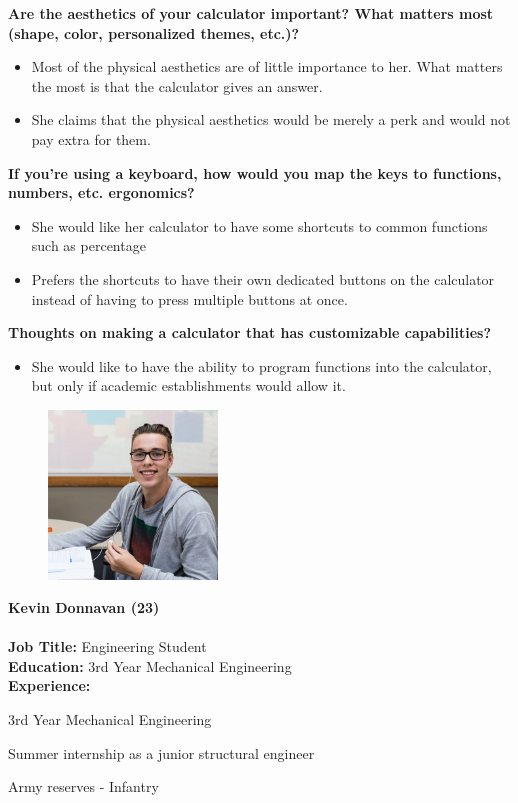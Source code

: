 \documentclass{article}
\begin{document}
\textbf{Are the aesthetics of your calculator important? What matters most (shape, color,  personalized themes, etc.)?}
\begin{itemize}
\itemsep0em 
\item Most of the physical aesthetics are of little importance to her. What matters the most is that the calculator gives an answer.
\item She claims that the physical aesthetics would be merely a perk and would not pay extra for them.
\end{itemize}

\textbf{If you’re using a keyboard, how would you map the keys to functions, numbers, etc. ergonomics?}
\begin{itemize}
\itemsep0em 
\item She would like her calculator to have some shortcuts to common functions such as percentage 
\item Prefers the shortcuts to have their own dedicated buttons on the calculator instead of having to press multiple buttons at once.
\end{itemize}

\textbf{Thoughts on making a calculator that has customizable capabilities? }
\begin{itemize}
\itemsep0em 
\item She would like to have the ability to program functions into the calculator, but only if academic establishments would allow it. 
\end{itemize}
\pagebreak

\begin{figure}
\includegraphics[width=0.4\textwidth]{kevin2.jpg}
\end{figure}
\textbf{\large Kevin Donnavan (23)} \\ \\
\textbf{Job Title: }Engineering Student\\
\textbf{Education:} 3rd Year Mechanical Engineering\\
\textbf{Experience:}
\begin{compactitem}
\item 3rd Year Mechanical Engineering
\item Summer internship as a junior structural engineer
\item Army reserves - Infantry
\end{compactitem}
\end{document}

